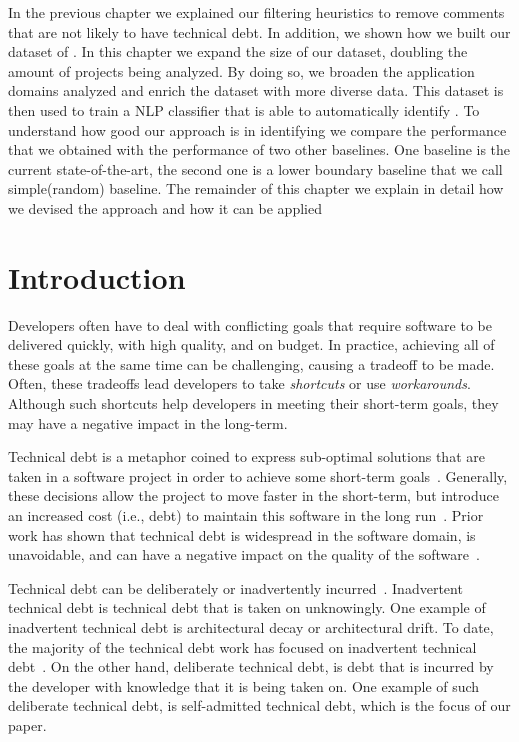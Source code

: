 In the previous chapter we explained our filtering heuristics to remove comments that are not likely to have technical debt. In addition, we shown how we built our dataset of \SATD. In this chapter we expand the size of our dataset, doubling the amount of projects being analyzed. By doing so, we broaden the application domains analyzed and enrich the dataset with more diverse data. This dataset is then used to train a NLP classifier that is able to automatically identify \SATD. To understand how good our approach is in identifying \SATD we compare the performance that we obtained with the performance of two other baselines. One baseline is the current state-of-the-art, the second one is a lower boundary baseline that we call simple(random) baseline. The remainder of this chapter we explain in detail how we devised the approach and how it can be applied

\section{Introduction}
\label{chap4:sec:introduction}

Developers often have to deal with conflicting goals that require software to be delivered quickly, with high quality, and on budget. In practice, achieving all of these goals at the same time can be challenging, causing a tradeoff to be made. Often, these tradeoffs lead developers to take \emph{shortcuts} or use \emph{workarounds}. Although such shortcuts help developers in meeting their short-term goals, they may have a negative impact in the long-term.

Technical debt is a metaphor coined to express sub-optimal solutions that are taken in a software project in order to achieve some short-term goals~\cite{Cunningham1992WPM}. Generally, these decisions allow the project to move faster in the short-term, but introduce an increased cost (i.e., debt) to maintain this software in the long run~\cite{Seaman2011,Kruchten2013IWMTD}.  Prior work has shown that technical debt is widespread in the software domain, is unavoidable, and can have a negative impact on the quality of the software~\cite{Lim2012Software}. 

Technical debt can be deliberately or inadvertently incurred~\cite{MartinFowler:TechnicalDebtQuadrant}. Inadvertent technical debt is technical debt that is taken on unknowingly. One example of inadvertent technical debt is architectural decay or architectural drift. To date, the majority of the technical debt work has focused on inadvertent technical debt~\cite{Nord2012WICSA}. On the other hand, deliberate technical debt, is debt that is incurred by the developer with knowledge that it is being taken on. One example of such deliberate technical debt, is self-admitted technical debt, which is the focus of our paper.

